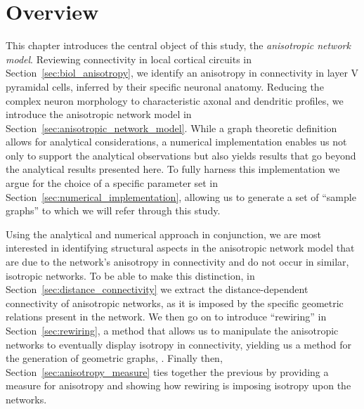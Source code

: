 
\section{Overview}\label{sec:intro_model}

This chapter introduces the central object of this study, the
\textit{anisotropic network model}. Reviewing connectivity in local
cortical circuits in Section~\ref{sec:biol_anisotropy}, we identify an
anisotropy in connectivity in layer V pyramidal cells, inferred by
their specific neuronal anatomy. Reducing the complex neuron
morphology to characteristic axonal and dendritic profiles, we
introduce the anisotropic network model in
Section~\ref{sec:anisotropic_network_model}.  While a graph theoretic
definition allows for analytical considerations, a numerical
implementation enables us not only to support the analytical
observations but also yields results that go beyond the analytical
results presented here. To fully harness this implementation we argue
for the choice of a specific parameter set in
Section~\ref{sec:numerical_implementation}, allowing us to generate a
set of \enquote{sample graphs} to which we will refer through this
study.

Using the analytical and numerical approach in conjunction, we are
most interested in identifying structural aspects in the anisotropic
network model that are due to the network's anisotropy in connectivity
and do not occur in similar, isotropic networks. To be able to make
this distinction, in Section~\ref{sec:distance_connectivity} we
extract the distance-dependent connectivity of anisotropic networks,
as it is imposed by the specific geometric relations present in the
network.  We then go on to introduce \enquote{rewiring} in
Section~\ref{sec:rewiring}, a method that allows us to manipulate the
anisotropic networks to eventually display isotropy in connectivity,
yielding us a method for the generation of geometric graphs,
. Finally then, Section~\ref{sec:anisotropy_measure} ties together the
previous by providing a measure for anisotropy and showing how
rewiring is imposing isotropy upon the networks. 





